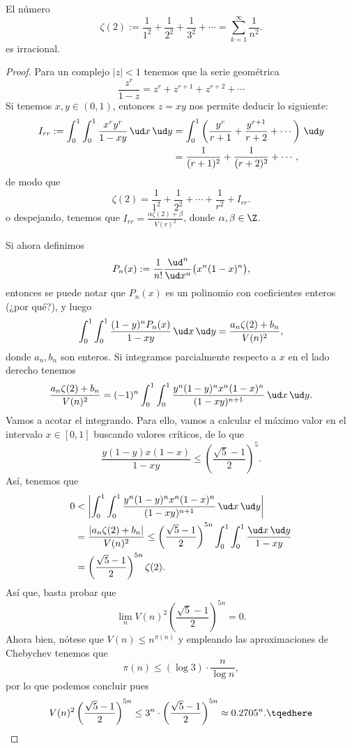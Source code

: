 \documentclass[teoria-numeros.tex]{subfiles}
\begin{document}
\begin{prop}
	El número
	$$ \zeta(2) := \frac{1}{1^2} + \frac{1}{2^2} + \frac{1}{3^2} + \cdots = \sum_{k=1}^{\infty} \frac{1}{n^2}. $$
	es irracional.
\end{prop}
\begin{proof}
	Para un complejo $|z| < 1$ tenemos que la serie geométrica
	$$ \frac{z^r}{1 - z} = z^r + z^{r+1} + z^{r+2} + \cdots $$
	Si tenemos $x, y \in (0, 1)$, entonces $z = xy$ nos permite deducir lo siguiente:
	\begin{align*}
		I_{rr} := \int_{0}^{1} \int_{0}^{1} \frac{x^ry^r}{1 - xy} \, \ud x \, \ud y &=
		\int_{0}^{1} \left( \frac{y^r}{r+1} + \frac{y^{r+1}}{r+2} + \cdots \right) \, \ud y \\
											    &= \frac{1}{(r+1)^2} + \frac{1}{(r+2)^2} + \cdots,
	\end{align*}
	de modo que
	$$ \zeta(2) = \frac{1}{1^2} + \frac{1}{2^2} + \cdots + \frac{1}{r^2} + I_{rr}.  $$
	o despejando, tenemos que $I_{rr} = \frac{\alpha \zeta(2) + \beta}{V(r)^2}$, donde $\alpha, \beta \in \Z$.

	Si ahora definimos
	$$ P_n(x) := \frac{1}{n!} \frac{\ud^n}{\ud x^n}\big( x^n(1 - x)^n \big), $$
	entonces se puede notar que $P_n(x)$ es un polinomio con coeficientes enteros (¿por qué?), y luego
	$$ \int_{0}^{1} \int_{0}^{1} \frac{(1 - y)^n P_n(x)}{1 - xy} \, \ud x \, \ud y = \frac{a_n \zeta(2) + b_n}{V(n)^2}, $$
	donde $a_n, b_n$ son enteros. Si integramos parcialmente respecto a $x$ en el lado derecho tenemos
	$$ \frac{a_n \zeta(2) + b_n}{V(n)^2} = (-1)^n \int_{0}^{1} \int_{0}^{1} \frac{y^n(1 - y)^n x^n(1 - x)^n}{(1 - xy)^{n+1}} \, \ud x \, \ud y. $$
	Vamos a acotar el integrando. Para ello, vamos a calcular el máximo valor en el intervalo $x \in [0, 1]$ buscando valores críticos, de lo que
	$$ \frac{y(1 - y) x(1 - x)}{1 - xy} \le \left( \frac{\sqrt{5} - 1}{2} \right)^5. $$
	Así, tenemos que
	\begin{align*}
		0 &< \left| \int_{0}^{1} \int_{0}^{1} \frac{y^n(1 - y)^n x^n(1 - x)^n}{(1 - xy)^{n+1}} \, \ud x \, \ud y \right| \\
		  &= \frac{|a_n \zeta(2) + b_n|}{V(n)^2} \le \left( \frac{\sqrt{5} - 1}{2} \right)^{5n} \int_{0}^{1} \int_{0}^{1} \frac{\ud x \, \ud y}{1 - xy} \\
		  &= \left( \frac{\sqrt{5} - 1}{2} \right)^{5n} \zeta(2).
	\end{align*}
	Así que, basta probar que
	\[
		\lim_n V(n)^2 \left( \frac{\sqrt{5} - 1}{2} \right)^{5n} = 0.
	\]
	Ahora bien, nótese que $V(n) \le n^{\pi(n)}$ y empleando las aproximaciones de Chebychev tenemos que
	$$ \pi(n) \le (\log 3) \cdot \frac{n}{\log n}, $$
	por lo que podemos concluir pues
	\begin{equation}
		V(n)^2 \left( \frac{\sqrt{5} - 1}{2} \right)^{5n} \le 3^n \cdot \left( \frac{\sqrt{5} - 1}{2} \right)^{5n} \approx 0.2705^n.
		\tqedhere
	\end{equation}
\end{proof}
\end{document}
